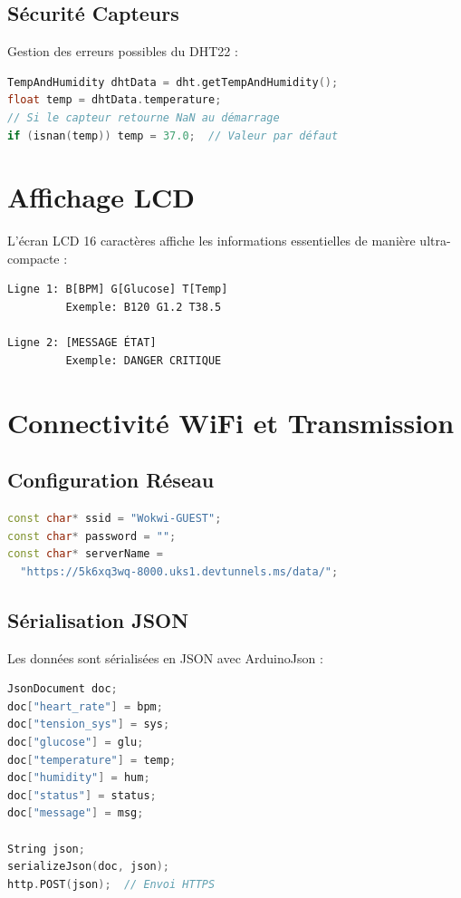 \documentclass[12pt,french]{report}
\begin{document}
\subsection{Sécurité Capteurs}

Gestion des erreurs possibles du DHT22 :

\begin{lstlisting}[language=C++]
TempAndHumidity dhtData = dht.getTempAndHumidity();
float temp = dhtData.temperature;
// Si le capteur retourne NaN au démarrage
if (isnan(temp)) temp = 37.0;  // Valeur par défaut
\end{lstlisting}

\section{Affichage LCD}

L'écran LCD 16 caractères affiche les informations essentielles de manière ultra-compacte :

\begin{verbatim}
Ligne 1: B[BPM] G[Glucose] T[Temp]
         Exemple: B120 G1.2 T38.5

Ligne 2: [MESSAGE ÉTAT]
         Exemple: DANGER CRITIQUE
\end{verbatim}

\section{Connectivité WiFi et Transmission}

\subsection{Configuration Réseau}

\begin{lstlisting}[language=C++]
const char* ssid = "Wokwi-GUEST";
const char* password = "";
const char* serverName = 
  "https://5k6xq3wq-8000.uks1.devtunnels.ms/data/";
\end{lstlisting}

\subsection{Sérialisation JSON}

Les données sont sérialisées en JSON avec ArduinoJson :

\begin{lstlisting}[language=C++]
JsonDocument doc;
doc["heart_rate"] = bpm;
doc["tension_sys"] = sys;
doc["glucose"] = glu;
doc["temperature"] = temp;
doc["humidity"] = hum;
doc["status"] = status;
doc["message"] = msg;

String json;
serializeJson(doc, json);
http.POST(json);  // Envoi HTTPS
\end{lstlisting}
\end{document}
